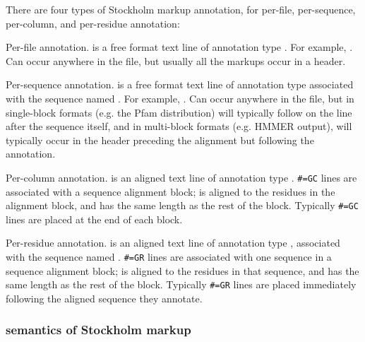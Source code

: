 There are four types of Stockholm markup annotation, for per-file,
per-sequence, per-column, and per-residue annotation:

\begin{sreitems}{}
\item [\emprog{\#=GF <tag> <s>}]
        Per-file annotation.  is a free format text line
        of annotation type . For example, . Can occur anywhere in the file, but usually
        all the  markups occur in a header.

\item [\emprog{\#=GS <seqname> <tag> <s>}]
        Per-sequence annotation.  is a free format text line
        of annotation type  associated with the sequence
        named . For example, . Can occur anywhere
        in the file, but in single-block formats (e.g. the Pfam
        distribution) will typically follow on the line after the
        sequence itself, and in multi-block formats (e.g. HMMER
        output), will typically occur in the header preceding the
        alignment but following the  annotation.

\item [\emprog{\#=GC <tag> <..s..>}]
        Per-column annotation.  is an aligned text line
        of annotation type .
        \verb+#=GC+ lines are
        associated with a sequence alignment block; 
        is aligned to the residues in the alignment block, and has
        the same length as the rest of the block.
        Typically \verb+#=GC+ lines are placed at the end of each block.

\item [\emprog{\#=GR <seqname> <tag> <..s..>}]
        Per-residue annotation.  is an aligned text line
        of annotation type , associated with the sequence
        named . 
        \verb+#=GR+ lines are 
        associated with one sequence in a sequence alignment block; 
        is aligned to the residues in that sequence, and has
        the same length as the rest of the block.
        Typically
        \verb+#=GR+ lines are placed immediately following the
        aligned sequence they annotate.
\end{sreitems}

\subsubsection{semantics of Stockholm markup}

